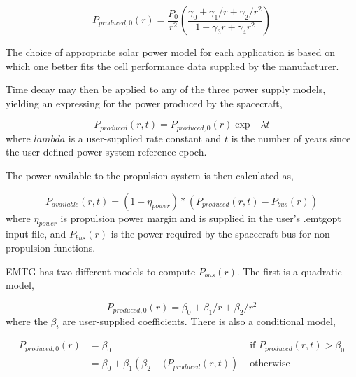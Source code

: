 \begin{equation}
P_{produced,0}\left(r\right) = \frac{P_0}{r^2} \left(\frac{\gamma_0 + \gamma_1 / r + \gamma_2 / r^2}{1 + \gamma_3 r + \gamma_4 r^2}\right)
\label{eq:sauerpower}
\end{equation}

The choice of appropriate solar power model for each application is based on which one better fits the cell performance data supplied by the manufacturer.

Time decay may then be applied to any of the three power supply models, yielding an expressing for the power produced by the spacecraft,

\begin{equation}
P_{produced}\left(r, t\right) = P_{produced,0}\left(r\right) \exp{-\lambda t}
\label{eq:timepower}
\end{equation}
%
where $lambda$ is a user-supplied rate constant and $t$ is the number of years since the user-defined power system reference epoch.

The power available to the propulsion system is then calculated as,

\begin{equation}
	P_{available}\left(r, t\right) = \left(1 -  \eta_{power}\right) * \left(P_{produced}\left(r, t\right)  - P_{bus}\left(r\right)\right)
	\label{eq:availablepower}
\end{equation}
%
where $\eta_{power}$ is propulsion power margin and is supplied in the user's .emtgopt input file, and $P_{bus}\left(r\right)$ is the power required by the spacecraft bus for non-propulsion functions.

\ac{EMTG} has two different models to compute $P_{bus}\left(r\right)$. The first is a quadratic model,

\begin{equation}
	P_{produced,0}\left(r\right) = \beta_0 + \beta_1 / r + \beta_2 / r^2
	\label{eq:quadratic_bus_power}
\end{equation}
%
where the $\beta_i$ are user-supplied coefficients. There is also a conditional model,

\begin{align}
P_{produced,0}\left(r\right) &= \beta_0 & \text{ if } P_{produced}\left(r, t\right) > \beta_0\\
&= \beta_0  + \beta_1 \left(\beta_2 - (P_{produced}\left(r, t\right)\right) & \text{ otherwise }
\label{eq:conditional_bus_power}
\end{align}

